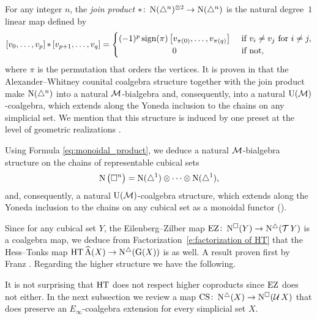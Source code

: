\begin{example*}
	For any integer $n$, the \textit{join product} $\ast \colon \operatorname{N}(\triangle^n)^{\otimes 2} \to \operatorname{N}(\triangle^n)$ is the natural degree~$1$ linear map defined by
	\begin{equation*}
	\left[v_0, \dots, v_p \right] \pr \left[v_{p+1}, \dots, v_q\right] =
	\begin{cases} (-1)^{p} \sign(\pi) \left[v_{\pi(0)}, \dots, v_{\pi(q)}\right] & \text{ if } v_i \neq v_j \text{ for } i \neq j, \\
	\hfil 0 & \text{ if not}, \end{cases}
	\end{equation*}
	where $\pi$ is the permutation that orders the vertices.
	It is proven in \cite{medina2020prop1} that the Alexander--Whitney counital coalgebra structure together with the join product make $\operatorname{N}(\triangle^n)$ into a natural $\mathcal{M}$-bialgebra and, consequently, into a natural ${\operatorname{U}(\mathcal{M})}$-coalgebra, which extends along the Yoneda inclusion to the chains on any simplicial set.
	We mention that this structure is induced by one preset at the level of geometric realizations \cite{medina2021prop2}.
\end{example*}

\begin{example*}
	Using Formula \eqref{eq:monoidal_product}, we deduce a natural $\mathcal{M}$-bialgebra structure on the chains of representable cubical sets
	\[
	\operatorname{N}\big(\square^n\big) =
	\operatorname{N}(\triangle^1) \otimes\dotsb\otimes \operatorname{N}(\triangle^1),
	\]
	and, consequently, a natural ${\operatorname{U}(\mathcal{M})}$-coalgebra structure, which extends along the Yoneda inclusion to the chains on any cubical set as a monoidal functor (\cite[Theorem~5]{medina2021cobar}).
\end{example*}

Since for any cubical set $Y$, the Eilenberg--Zilber map $\operatorname{EZ} \colon \operatorname{N^{\square}}(Y) \to \operatorname{N^{\triangle}}(\operatorname{\mathcal{T}} Y)$ is a coalgebra map, we deduce from Factorization~\eqref{e:factorization of HT} that the Hess--Tonks map $\operatorname{HT} \operatorname{\widehat{A}}(X) \to \operatorname{N^{\triangle}}(\operatorname{G}(X))$ is as well.
A result proven first by Franz \cite{franz2020szczarba}.
Regarding the higher structure we have the following.

\begin{example*}
	\TBW{}
\end{example*}

It is not surprising that $\operatorname{HT}$ does not respect higher coproducts since $\operatorname{EZ}$ does not either.
In the next subsection we review a map $\operatorname{CS} \colon \operatorname{N^{\triangle}}(X) \to \operatorname{N^{\square}}(\operatorname{\mathcal{U}} X)$ that does preserve an $E_\infty$-coalgebra extension for every simplicial set $X$.

